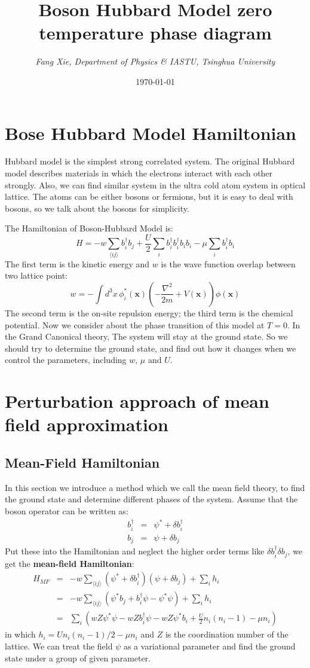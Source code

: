 \documentclass{article}
\author{\emph{Fang Xie, Department of Physics \& IASTU, Tsinghua University}}
\title{{\bf{Boson Hubbard Model zero temperature phase diagram}}}
\date{\today}
\newcommand{\pnx}{\mathbf{x}}
\begin{document}
\maketitle
\section{Bose Hubbard Model Hamiltonian}
Hubbard model is the simplest strong correlated system. The original Hubbard model describes materials in which the electrons interact with each other strongly. Also, we can find similar system in the ultra cold atom system in optical lattice. The atoms can be either bosons or fermions, but it is easy to deal with bosons, so we talk about the bosons for simplicity.

The Hamiltonian of Boson-Hubbard Model is:
\begin{equation}
H = -w\sum_{\langle ij\rangle}b^\dagger_ib_j +\frac{U}{2}\sum_{i}b^\dagger_ib^\dagger_ib_ib_i - \mu \sum_i b^\dagger_i b_i
\end{equation}
The first term is the kinetic energy and $w$ is the wave function overlap between two lattice point:
$$
w = -\int d^3x\, \phi^*_i(\pnx)\left(-\frac{\nabla^2}{2m}+V(\pnx)\right)\phi(\pnx)
$$
The second term is the on-site repulsion energy; the third term is the chemical potential. Now we consider about the phase transition of this model at $T=0$. In the Grand Canonical theory, The system will stay at the ground state. So we should try to determine the ground state, and find out how it changes when we control the parameters, including $w$, $\mu$ and $U$.

\section{Perturbation approach of mean field approximation}
\subsection{Mean-Field Hamiltonian}
In this section we introduce a method which we call the mean field theory, to find the ground state and determine different phases of the system. Assume that the boson operator can be written as:
\begin{eqnarray}
b^\dagger_i& =& \psi^* + \delta b^\dagger_i\\
b_j &= & \psi + \delta b_j
\end{eqnarray}
Put these into the Hamiltonian and neglect the higher order terms like $\delta b^\dagger_i \delta b_j$, we get the {\bf{mean-field Hamiltonian}}:
\begin{eqnarray}
H_{MF} &=& -w \sum_{\langle ij\rangle}(\psi^* + \delta b^\dagger_i)(\psi+ \delta b_j) + \sum_i h_i \nonumber\\
&=& -w\sum_{\langle ij\rangle} \left( \psi^*b_j + b^\dagger_i \psi-\psi^*\psi \right) + \sum_i h_i\nonumber\\
&=& \sum_i \left( wZ\psi^*\psi -wZb^\dagger_i\psi -wZ\psi^*b_i +\frac{U}{2}n_i(n_i-1) - \mu n_i \right)
\end{eqnarray}
in which $h_i = Un_i(n_i-1)/2 -\mu n_i$ and $Z$ is the coordination number of the lattice. We can treat the field $\psi$ as a variational parameter and find the ground state under a group of given parameter.
\end{document}
